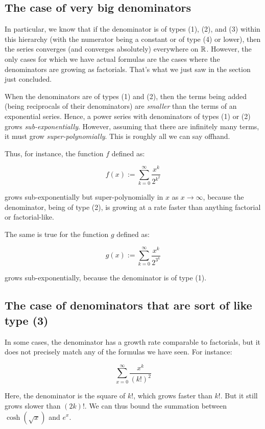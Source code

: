 \documentclass{amsart}
\begin{document}
\subsection{The case of very big denominators}

In particular, we know that if the denominator is of types (1), (2),
and (3) within this hierarchy (with the numerator being a constant or
of type (4) or lower), then the series converges (and converges
absolutely) everywhere on $\mathbb{R}$. However, the only cases for which we
have actual formulas are the cases where the denominators are growing
as factorials. That's what we just saw in the section just concluded.

When the denominators are of types (1) and (2), then the terms being
added (being reciprocals of their denominators) are {\em smaller} than
the terms of an exponential series. Hence, a power series with
denominators of types (1) or (2) grows {\em
sub-exponentially}. However, assuming that there are infinitely many
terms, it must grow {\em super-polynomially}. This is roughly all we
can say offhand.

Thus, for instance, the function $f$ defined as:

$$f(x) := \sum_{k=0}^\infty \frac{x^k}{2^{k^2}}$$

grows sub-exponentially but super-polynomially in $x$ as $x \to
\infty$, because the denominator, being of type (2), is growing at a
rate faster than anything factorial or factorial-like.

The same is true for the function $g$ defined as:

$$g(x) := \sum_{k=0}^\infty \frac{x^k}{2^{3^k}}$$

grows sub-exponentially, because the denominator is of type (1).

\subsection{The case of denominators that are sort of like type (3)}

In some cases, the denominator has a growth rate comparable to
factorials, but it does not precisely match any of the formulas we
have seen. For instance:

$$\sum_{x=0}^\infty \frac{x^k}{(k!)^2}$$

Here, the denominator is the square of $k!$, which grows faster than
$k!$. But it still grows slower than $(2k)!$. We can thus bound the
summation between $\cosh(\sqrt{x})$ and $e^x$.
\end{document}
